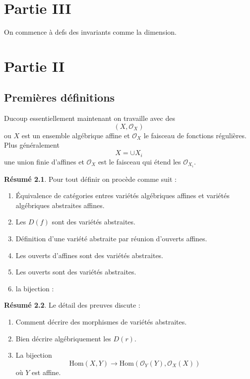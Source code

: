 \documentclass[a4paper,12pt]{book}
\newcommand{\Or}{\mathcal{O}}
\newcommand{\Hom}{\textrm{Hom}}
\theoremstyle{plain}
\theoremstyle{definition}
\newtheorem{res}{Résumé}
\theoremstyle{remark}
\begin{document}
\chapter{Partie III}
On commence à defs des invariants comme la dimension.

\chapter{Partie II}
\section{Premières définitions}
Ducoup essentiellement maintenant on travaille avec des 
\[(X,\Or_X)\]
ou $X$ est un ensemble algébrique affine et $\Or_X$ le faisceau de
fonctions régulières. Plus généralement
\[X=\cup X_i\]
une union finie d'affines et $\Or_X$ est le faisceau qui étend les 
$\Or_{X_i}$.
\begin{res}
 Pour tout définir on procède comme suit :
    \begin{enumerate}
	\item Équivalence de catégories entres variétés algébriques affines
	    et variétés algébriques abstraites affines.
	\item Les $D(f)$ sont des variétés abstraites.
	\item Définition d'une variété abstraite par réunion d'ouverts 
	    affines.
	\item Les ouverts d'affines sont des variétés abstraites.
	\item Les ouverts sont des variétés abstraites.
	\item la bijection :
    \end{enumerate}
\end{res}
\begin{res}
Le détail des preuves discute :
    \begin{enumerate}
	\item Comment décrire des morphismes de variétés abstraites.
	\item Bien décrire algébriquement les $D(r)$.
	\item La bijection
	    \[\Hom(X,Y)\to \Hom(\Or_Y(Y),\Or_X(X))\]
	    où $Y$ est affine.
    \end{enumerate}
\end{res}
\end{document}
